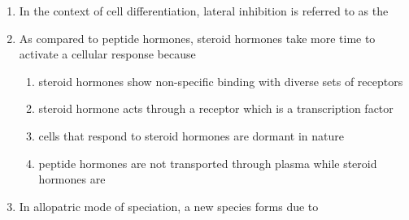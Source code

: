 \documentclass[journal,12pt,onecolumn]{IEEEtran}
\theoremstyle{remark}
\begin{document}
\begin{enumerate}
\begin{enumerate}
\end{enumerate}

\item In the context of cell differentiation, lateral inhibition is referred to as the

\hfill{}

\begin{enumerate}
\end{enumerate}

\item As compared to peptide hormones, steroid hormones take more time to activate a cellular response because

\hfill{}

\begin{enumerate}
\item steroid hormones show non-specific binding with diverse sets of receptors
\item steroid hormone acts through a receptor which is a transcription factor
\item cells that respond to steroid hormones are dormant in nature
\item peptide hormones are not transported through plasma while steroid hormones are
\end{enumerate}

\item In allopatric mode of speciation, a new species forms due to


\end{enumerate}
\end{document}

